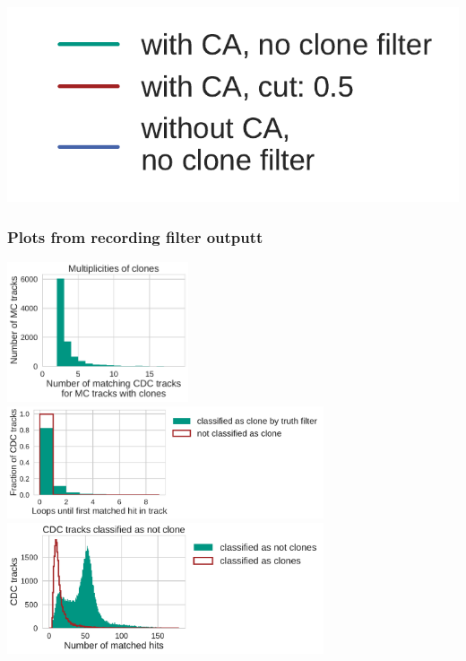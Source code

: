 \documentclass[18pt, aspectratio=169]{beamer}
\begin{document}
\begin{frame}
\begin{columns}
\begin{column}{.5\textwidth}
    \end{column}
  \end{columns}
  \begin{center}
    \includegraphics[width=.2\textwidth]{figures/legend_fom_profile.pdf}
  \end{center}

\end{frame}

\begin{frame}[allowframebreaks]
  \frametitle{Plots from recording filter outputt}
  \includegraphics[width=0.4\textwidth]{figures/clone_multiplicities.pdf}\\
  \includegraphics[width=0.7\textwidth]{figures/loop_numbers.pdf}\\
  \includegraphics[width=0.7\textwidth]{figures/matched_hits.pdf}\\
\end{frame}
\end{document}
